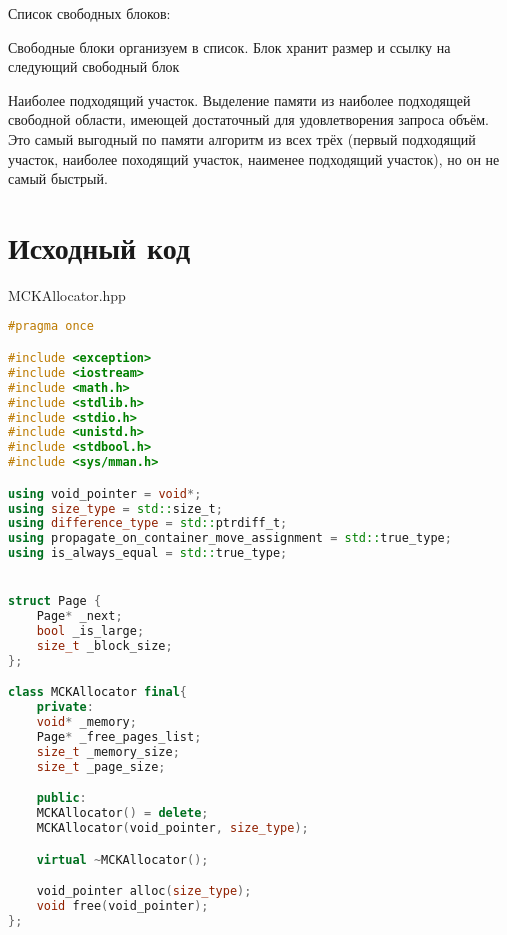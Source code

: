 \documentclass[a4paper, 12pt]{article}
\begin{document}
    
Список свободных блоков:

Свободные блоки организуем в список. 
Блок хранит размер и ссылку на следующий свободный блок

Наиболее подходящий участок. Выделение памяти из наиболее подходящей свободной области, имеющей достаточный для удовлетворения запроса объём. Это самый выгодный по памяти алгоритм из всех трёх (первый подходящий участок, наиболее походящий участок, наименее подходящий участок), но он не самый быстрый.

\newpage

\section{Исходный код}
MCKAllocator.hpp
\begin{lstlisting}[language=C++]
#pragma once

#include <exception>
#include <iostream>
#include <math.h>
#include <stdlib.h>
#include <stdio.h>
#include <unistd.h>
#include <stdbool.h>
#include <sys/mman.h>

using void_pointer = void*;
using size_type = std::size_t;
using difference_type = std::ptrdiff_t;
using propagate_on_container_move_assignment = std::true_type;
using is_always_equal = std::true_type;


struct Page {
    Page* _next;
    bool _is_large;
    size_t _block_size;
};

class MCKAllocator final{
    private:
    void* _memory;
    Page* _free_pages_list;
    size_t _memory_size;
    size_t _page_size;

    public:
    MCKAllocator() = delete;
    MCKAllocator(void_pointer, size_type);

    virtual ~MCKAllocator();

    void_pointer alloc(size_type);
    void free(void_pointer);
};
\end{lstlisting}
\end{document}
